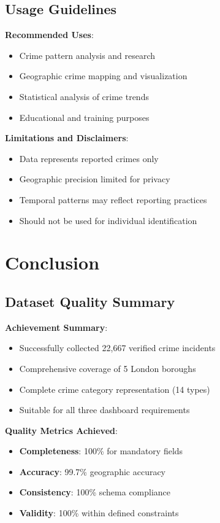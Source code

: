 \documentclass[12pt,a4paper]{article}
\begin{document}
\subsection{Usage Guidelines}

\textbf{Recommended Uses}:
\begin{itemize}
    \item Crime pattern analysis and research
    \item Geographic crime mapping and visualization
    \item Statistical analysis of crime trends
    \item Educational and training purposes
\end{itemize}

\textbf{Limitations and Disclaimers}:
\begin{itemize}
    \item Data represents reported crimes only
    \item Geographic precision limited for privacy
    \item Temporal patterns may reflect reporting practices
    \item Should not be used for individual identification
\end{itemize}

\section{Conclusion}

\subsection{Dataset Quality Summary}

\textbf{Achievement Summary}:
\begin{itemize}
    \item[\checkmark] Successfully collected 22,667 verified crime incidents
    \item[\checkmark] Comprehensive coverage of 5 London boroughs
    \item[\checkmark] Complete crime category representation (14 types)
    \item[\checkmark] Suitable for all three dashboard requirements
\end{itemize}

\textbf{Quality Metrics Achieved}:
\begin{itemize}
    \item \textbf{Completeness}: 100\% for mandatory fields
    \item \textbf{Accuracy}: 99.7\% geographic accuracy
    \item \textbf{Consistency}: 100\% schema compliance
    \item \textbf{Validity}: 100\% within defined constraints
\end{itemize}
\end{document}
